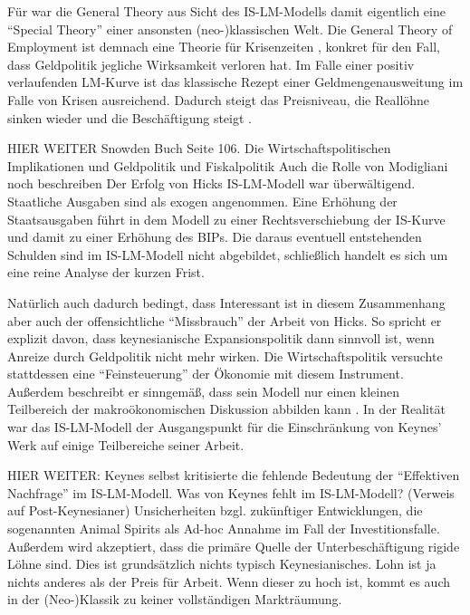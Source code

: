 Für \textcite{Hicks1937} war die General Theory aus Sicht des IS-LM-Modells damit eigentlich eine "`Special Theory"' einer ansonsten (neo-)klassischen Welt. Die General Theory of Employment ist demnach eine Theorie für Krisenzeiten \parencite[S. 155]{Hicks1937}, konkret für den Fall, dass Geldpolitik jegliche Wirksamkeit verloren hat. Im Falle einer positiv verlaufenden LM-Kurve ist das klassische Rezept einer Geldmengenausweitung im Falle von Krisen ausreichend. Dadurch steigt das Preisniveau, die Reallöhne sinken wieder und die Beschäftigung steigt \parencite[S. 30]{DeVroey2016}.

HIER WEITER Snowden Buch Seite 106. Die Wirtschaftspolitischen Implikationen und Geldpolitik und Fiskalpolitik
Auch die Rolle von Modigliani noch beschreiben
Der Erfolg von Hicks IS-LM-Modell war überwältigend. Staatliche Ausgaben sind als exogen angenommen. Eine Erhöhung der Staatsausgaben führt in dem Modell zu einer Rechtsverschiebung der IS-Kurve und damit zu einer Erhöhung des BIPs. Die daraus eventuell entstehenden Schulden sind im IS-LM-Modell nicht abgebildet, schließlich handelt es sich um eine reine Analyse der kurzen Frist.


Natürlich auch dadurch bedingt, dass 
Interessant ist in diesem Zusammenhang aber auch der offensichtliche "`Missbrauch"' der Arbeit von Hicks. So spricht er explizit \parencite[S. 154]{Hicks1937} davon, dass keynesianische Expansionspolitik dann sinnvoll ist, wenn Anreize durch Geldpolitik nicht mehr wirken. Die Wirtschaftspolitik versuchte stattdessen eine "`Feinsteuerung"' der Ökonomie mit diesem Instrument. Außerdem beschreibt er sinngemäß, dass sein Modell nur einen kleinen Teilbereich der makroökonomischen Diskussion abbilden kann \parencite[S. 158]{Hicks1937}. In der Realität war das IS-LM-Modell der Ausgangspunkt für die Einschränkung von Keynes' Werk auf einige Teilbereiche seiner Arbeit.


HIER WEITER: \parencite{Patinkin1990}
Keynes selbst kritisierte die fehlende Bedeutung der "`Effektiven Nachfrage"' im IS-LM-Modell.
Was von Keynes fehlt im IS-LM-Modell? (Verweis auf Post-Keynesianer) Unsicherheiten bzgl. zukünftiger Entwicklungen, die sogenannten Animal Spirits als Ad-hoc Annahme im Fall der Investitionsfalle. Außerdem wird akzeptiert, dass die primäre Quelle der Unterbeschäftigung rigide Löhne sind. Dies ist grundsätzlich nichts typisch Keynesianisches. Lohn ist ja nichts anderes als der Preis für Arbeit. Wenn dieser zu hoch ist, kommt es auch in der (Neo-)Klassik zu keiner vollständigen Markträumung.


